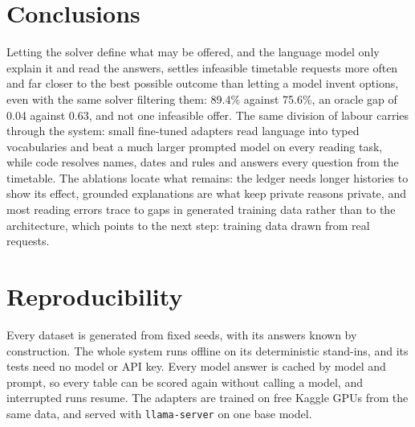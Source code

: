 \documentclass[11pt,a4paper]{article}
\begin{document}
\section{Conclusions}
Letting the solver define what may be offered, and the language model only explain it and read the answers, settles
infeasible timetable requests more often and far closer to the best possible outcome than letting a model invent
options, even with the same solver filtering them: 89.4\% against 75.6\%, an oracle gap of 0.04 against 0.63, and not
one infeasible offer. The same division of labour carries through the system: small fine-tuned adapters read
language into typed vocabularies and beat a much larger prompted model on every reading task, while code resolves
names, dates and rules and answers every question from the timetable. The ablations locate what remains: the ledger
needs longer histories to show its effect, grounded explanations are what keep private reasons private, and most
reading errors trace to gaps in generated training data rather than to the architecture, which points to the next
step: training data drawn from real requests.

\section*{Reproducibility}
\small
Every dataset is generated from fixed seeds, with its answers known by construction. The whole system runs offline
on its deterministic stand-ins, and its tests need no model or API key. Every model answer is cached by model and
prompt, so every table can be scored again without calling a model, and interrupted runs resume. The adapters are
trained on free Kaggle GPUs from the same data, and served with \texttt{llama-server} on one base model.
\normalsize
\end{document}
